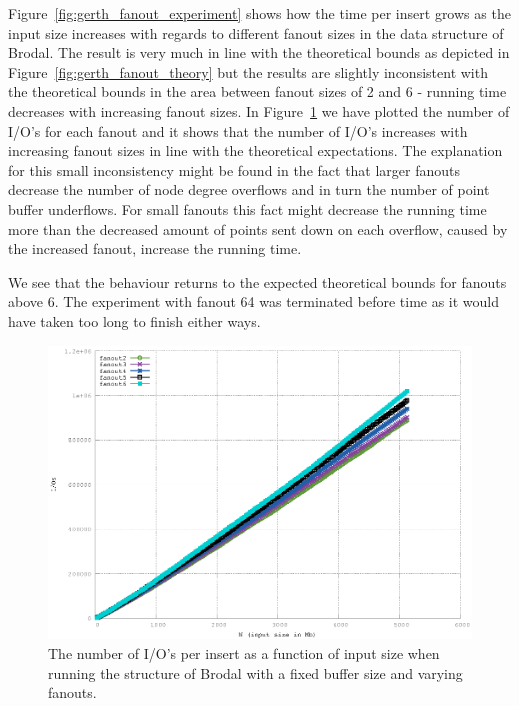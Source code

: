 \documentclass[twoside,11pt,openright]{report}
\begin{document}
Figure~\ref{fig:gerth_fanout_experiment} shows how the time per insert grows as the input size increases with regards to different fanout sizes in the data structure of Brodal. The result is very much in line with the theoretical bounds as depicted in Figure~\ref{fig:gerth_fanout_theory} but the results are slightly inconsistent with the theoretical bounds in the area between fanout sizes of 2 and 6 - running time decreases with increasing fanout sizes. In Figure~\ref{fig:gerth_fanout_experiment_ios} we have plotted the number of I/O's for each fanout and it shows that the number of I/O's increases with increasing fanout sizes in line with the theoretical expectations. The explanation for this small inconsistency might be found in the fact that larger fanouts decrease the number of node degree overflows and in turn the number of point buffer underflows. For small fanouts this fact might decrease the running time more than the decreased amount of points sent down on each overflow, caused by the increased fanout, increase the running time.

We see that the behaviour returns to the expected theoretical bounds for fanouts above 6. The experiment with fanout 64 was terminated before time as it would have taken too long to finish either ways.

\begin{figure}
\centering
\includegraphics[width=\textwidth]{../src/experiments/gerth_fanout_experiment_results/2016-05-06.11_52_24/ios}
\caption{The number of I/O's per insert as a function of input size when running the structure of Brodal with a fixed buffer size and varying fanouts.}
\label{fig:gerth_fanout_experiment_ios}
\end{figure}
\end{document}
